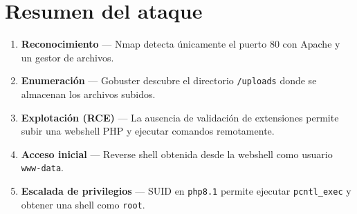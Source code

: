 \documentclass[12pt,a4paper]{article}
\begin{document}
\section{Resumen del ataque}

\begin{enumerate}
  \item \textbf{Reconocimiento} — Nmap detecta únicamente el puerto 80 con Apache y un gestor de archivos.
  \item \textbf{Enumeración} — Gobuster descubre el directorio \texttt{/uploads} donde se almacenan los archivos subidos.
  \item \textbf{Explotación (RCE)} — La ausencia de validación de extensiones permite subir una webshell PHP y ejecutar comandos remotamente.
  \item \textbf{Acceso inicial} — Reverse shell obtenida desde la webshell como usuario \texttt{www-data}.
  \item \textbf{Escalada de privilegios} — SUID en \texttt{php8.1} permite ejecutar \texttt{pcntl\_exec} y obtener una shell como \texttt{root}.
\end{enumerate}
\end{document}
